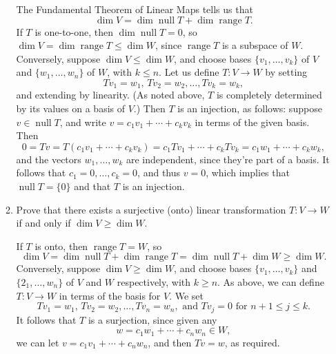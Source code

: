 \documentclass[letterpaper,12pt]{article}
\DeclareMathOperator{\nul}{null}
\DeclareMathOperator{\range}{range}
\begin{document}
\begin{enumerate}
\begin{enumerate}
\bigskip

The Fundamental Theorem of Linear Maps tells us that
\[
 \dim V = \dim\nul T + \dim\range T.
\]
If $T$ is one-to-one, then $\dim\nul T=0$, so $\dim V  = \dim \range T\leq \dim W$, since $\range T$ is a subspace of $W$. Conversely, suppose $\dim V\leq \dim W$, and choose bases $\{v_1,\ldots, v_k\}$ of $V$ and $\{w_1,\ldots, w_n\}$ of $W$, with $k\leq n$. Let us define $T:V\to W$ by setting
\[
 Tv_1 = w_1, \, Tv_2=w_2,\ldots, Tv_k = w_k,
\]
and extending by linearity. (As noted above, $T$ is completely determined by its values on a basis of $V$.) Then $T$ is an injection, as follows: suppose $v\in\nul T$, and write $v = c_1v_1+\cdots +c_kv_k$ in terms of the given basis. Then
\[
 0 = Tv = T(c_1v_1+\cdots +c_kv_k) = c_1Tv_1+\cdots +c_kTv_k = c_1w_1+\cdots+c_kw_k,
\]
and the vectors $w_1,\ldots, w_k$ are independent, since they're part of a basis. It follows that $c_1=0,\ldots, c_k=0$, and thus $v=0$, which implies that $\nul T=\{0\}$ and that $T$ is an injection.

\bigskip

\item Prove that there exists a surjective (onto) linear transformation $T:V\to W$ if and only if $\dim V\geq \dim W$.


\bigskip

If $T$ is onto, then $\range T= W$, so
\[
 \dim V = \dim \nul T + \dim \range T = \dim \nul T +\dim W \geq \dim W.
\]
Conversely, suppose $\dim V\geq \dim W$, and choose bases $\{v_1,\ldots, v_k\}$ and $\{2_1,\ldots, w_n\}$ of $V$ and $W$ respectively, with $k\geq n$. As above, we can define $T:V\to W$ in terms of the basis for $V$. We set
\[
 Tv_1=w_1, \, Tv_2 = w_2,\ldots, Tv_n = w_n, \text{ and } Tv_j = 0 \text{ for } n+1\leq j\leq k.
\]
It follows that $T$ is a surjection, since given any 
\[
 w = c_1w_1+\cdots +c_nw_n\in W,
\]
we can let $v = c_1v_1+\cdots+c_nw_n$, and then $Tv = w$, as required.

\bigskip

\end{enumerate}

 \end{enumerate}
\end{document}
